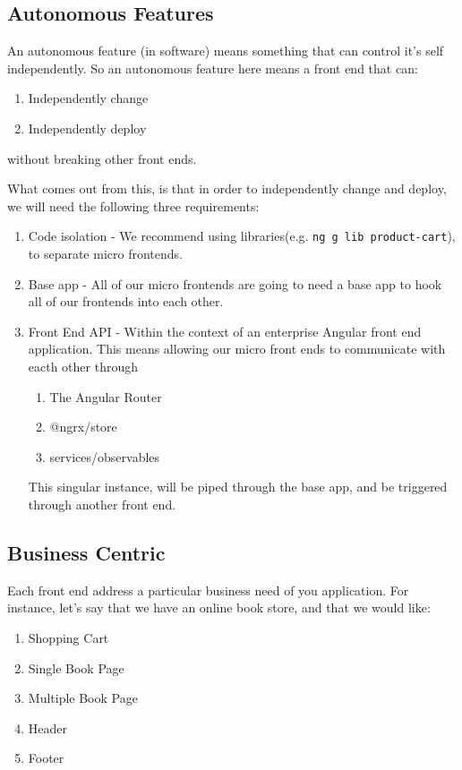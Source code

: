 \subsection{Autonomous Features}
An autonomous feature (in software) means something that can control it's self independently. So an autonomous feature here means a front end that can:
\begin{enumerate}
  \item Independently change 
  \item Independently deploy 
\end{enumerate}
without breaking other front ends. 

What comes out from this, is that in order to independently change and deploy, we will need the following three requirements: 
\begin{enumerate} 
  \item Code isolation - We recommend using libraries(e.g. \lstinline{ng g lib product-cart}), to separate micro frontends.
  \item Base app - All of our micro frontends are going to need a base app to hook all of our frontends into each other.
  \item Front End API - Within the context of an enterprise Angular front end application. This means allowing our micro front ends to communicate with eacth other through 
  \begin{enumerate}
    \item The Angular Router
    \item @ngrx/store
    \item services/observables
  \end{enumerate}
  This singular instance, will be piped through the base app, and be triggered through another front end. 
\end{enumerate} 

\subsection{Business Centric}
Each front end address a particular business need of you application.
For instance, let's say that we have an online book store, and that we would like:
\begin{enumerate}
  \item Shopping Cart
  \item Single Book Page
  \item Multiple Book Page
  \item Header
  \item Footer 
\end{enumerate}

